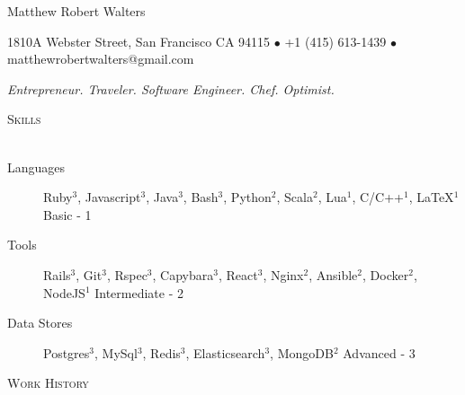 \documentclass{article}
\newcommand{\lineunder}{\vspace*{-8pt} \\ \hspace*{-18pt} \hrulefill \\}
\newcommand{\header}[1]{{\hspace*{-15pt}\vspace*{6pt} \textsc{#1}} \vspace*{-6pt} \lineunder}
\begin{document}
\small
\smallskip
\vspace*{-44pt}


\begin{center}
 
\huge Matthew Robert Walters 
\linebreak
\normalsize

{1810A Webster Street, San Francisco CA 94115 $\bullet$ +1 (415) 613-1439 $\bullet$ matthewrobertwalters@gmail.com} \newline


 \textit{Entrepreneur. Traveler. Software Engineer. Chef. Optimist.}
\end{center}

\small

\header{Skills}

\begin{description}

\item[Languages] Ruby$^3$, Javascript$^3$, Java$^3$, Bash$^3$, Python$^2$, Scala$^2$, Lua$^1$, C/C++$^1$, \LaTeX$^1$             \hfill Basic - 1

\item[Tools] Rails$^3$, Git$^3$, Rspec$^3$, Capybara$^3$, React$^3$, Nginx$^2$, Ansible$^2$, Docker$^2$, NodeJS$^1$   \hfill Intermediate - 2	
			                                            
\item[Data Stores] Postgres$^3$, MySql$^3$, Redis$^3$, Elasticsearch$^3$, MongoDB$^2$                                                       \hfill Advanced - 3

\end{description}

\header{Work History}
\end{document}
